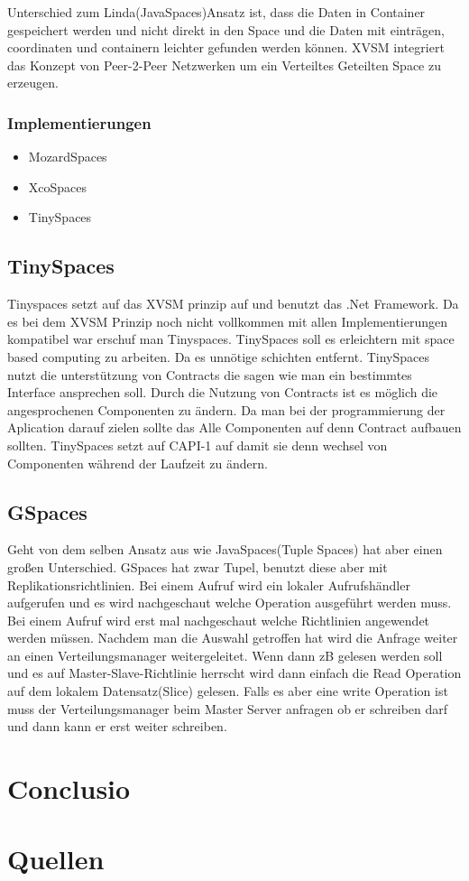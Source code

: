 \documentclass[a4paper,12pt]{scrreprt}
\begin{document}
		
		Unterschied zum Linda(JavaSpaces)Ansatz ist, dass die Daten in Container gespeichert werden und nicht direkt in den Space und die Daten mit einträgen, coordinaten und containern leichter gefunden werden können.
		XVSM integriert das Konzept von Peer-2-Peer Netzwerken um ein Verteiltes Geteilten Space zu erzeugen.
		
		\subsection{Implementierungen}
			\begin{itemize}
			\item MozardSpaces
			\item XcoSpaces
			\item TinySpaces
			\end{itemize}
		
		
		\section{TinySpaces}
			Tinyspaces setzt auf das XVSM prinzip auf und benutzt das .Net Framework. Da es bei dem XVSM Prinzip noch nicht vollkommen mit allen Implementierungen kompatibel war erschuf man Tinyspaces. 
			TinySpaces soll es erleichtern mit space based computing zu arbeiten. Da es unnötige schichten entfernt. 
			TinySpaces nutzt die unterstützung von Contracts die sagen wie man ein bestimmtes Interface ansprechen soll.
			Durch die Nutzung von Contracts ist es möglich die angesprochenen Componenten zu ändern. Da man bei der programmierung der Aplication darauf zielen sollte das Alle Componenten auf denn Contract aufbauen sollten.
			TinySpaces setzt auf CAPI-1 auf damit sie denn wechsel von Componenten während der Laufzeit zu ändern.
		\section{GSpaces}
		Geht von dem selben Ansatz aus wie JavaSpaces(Tuple Spaces) hat aber einen großen Unterschied. GSpaces hat zwar Tupel, benutzt diese aber mit Replikationsrichtlinien.  Bei einem Aufruf wird ein lokaler Aufrufshändler aufgerufen und es wird nachgeschaut welche Operation ausgeführt werden muss. Bei  einem Aufruf wird erst mal nachgeschaut welche Richtlinien angewendet werden müssen. Nachdem man die Auswahl getroffen hat wird die Anfrage weiter an einen Verteilungsmanager weitergeleitet.  Wenn dann zB gelesen werden soll und es auf Master-Slave-Richtlinie herrscht wird dann einfach die Read Operation auf dem lokalem Datensatz(Slice) gelesen. Falls es aber eine write Operation ist muss der Verteilungsmanager beim Master Server anfragen ob er schreiben darf und dann kann er erst weiter schreiben.	
	
\chapter{Conclusio}

\chapter{Quellen}
\end{document}
